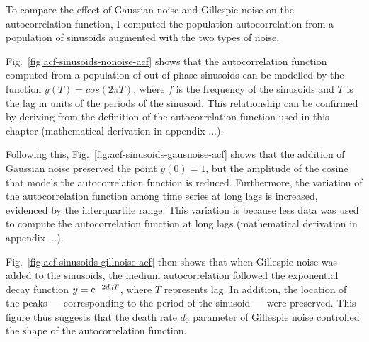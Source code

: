 To compare the effect of Gaussian noise and Gillespie noise on the autocorrelation function, I computed the population autocorrelation from a population of sinusoids augmented with the two types of noise.


Fig.\ \ref{fig:acf-sinusoids-nonoise-acf} shows that the autocorrelation function computed from a population of out-of-phase sinusoids can be modelled by the function $y(T) = cos(2 \pi T)$, where $f$ is the frequency of the sinusoids and $T$ is the lag in units of the periods of the sinusoid.
This relationship can be confirmed by deriving from the definition of the autocorrelation function used in this chapter (mathematical derivation in appendix ...).

Following this, Fig.\ \ref{fig:acf-sinusoids-gausnoise-acf} shows that the addition of Gaussian noise preserved the point $y(0) = 1$, but the amplitude of the cosine that models the autocorrelation function is reduced.
Furthermore, the variation of the autocorrelation function among time series at long lags is increased, evidenced by the interquartile range.
This variation is because less data was used to compute the autocorrelation function at long lags (mathematical derivation in appendix ...).

Fig.\ \ref{fig:acf-sinusoids-gillnoise-acf} then shows that when Gillespie noise was added to the sinusoids, the medium autocorrelation followed the exponential decay function $y = \mathrm{e}^{-2d_{0}T}$, where $T$ represents lag.
In addition, the location of the peaks --- corresponding to the period of the sinusoid --- were preserved.
This figure thus suggests that the death rate $d_{0}$ parameter of Gillespie noise controlled the shape of the autocorrelation function.


